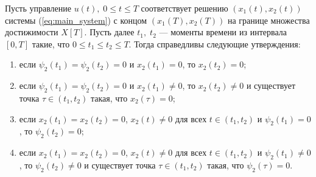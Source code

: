 \begin{assertion}
        Пусть управление $u(t),\; 0 \leqslant t \leqslant T$ соответствует решению $(x_1(t), x_2(t))$ системы (\ref{eq:main_system}) с концом $(x_1(T), x_2(T))$ на границе множества достижимости $X[T]$. Пусть далее $t_1,\; t_2$ --- моменты времени из интервала $[0, T]$ такие, что $0 \leqslant t_1 \leqslant t_2 \leqslant T$. Тогда справедливы следующие утверждения:
        \begin{enumerate}
                \item если $\psi_2(t_1) = \psi_2(t_2) = 0$ и $x_2(t_1) = 0$, то $x_2(t_2) = 0$;
                \item если $\psi_2(t_1) = \psi_2(t_2) = 0$ и $x_2(t_1) \neq 0$, то $x_2(t_2) \neq 0$ и существует точка $\tau \in (t_1, t_2)$ такая, что $x_2(\tau) = 0$;
                \item если $x_2(t_1) = x_2(t_2) = 0$, $x_2(t) \neq 0$ для всех $t \in (t_1, t_2)$ и $\psi_2(t_1) = 0$, то $\psi_2(t_2) = 0$;
                \item если $x_2(t_1) = x_2(t_2) = 0$, $x_2(t) \neq 0$ для всех $t \in (t_1, t_2)$ и $\psi_2(t_1) \neq 0$, то $\psi_2(t_2) \neq 0$ и существует точка $\tau \in (t_1, t_2)$ такая, что $\psi_2(\tau) = 0$.
        \end{enumerate}
\end{assertion}
